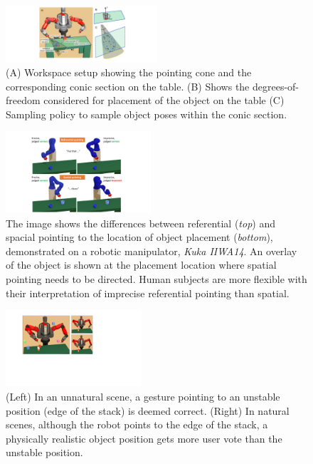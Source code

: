 
\begin{figure}[th!]
    \centering
    \includegraphics[width=0.5\textwidth]{pointing_diagram}
    \caption{(A) Workspace setup showing the pointing cone and the corresponding conic section on the table. (B) Shows the degrees-of-freedom considered for placement of the object on the table (C) Sampling policy to sample object poses within the conic section.}
    \label{fig:pointing}
\end{figure}

\begin{figure}[h!]
    \centering
    \includegraphics[width=0.48\textwidth]{spatial-referential.pdf}
    \caption{The image shows the differences between referential (\textit{top}) and spacial pointing to the location of object placement (\textit{bottom}), demonstrated on a robotic manipulator, \textit{Kuka IIWA14}. An overlay of the object is shown at the placement location where spatial pointing needs to be directed.  Human subjects are more flexible with their interpretation of imprecise referential pointing than spatial.}
    \label{fig:spatial}
\end{figure}

\begin{figure}[h!]
    \centering
    \includegraphics[width=0.45\textwidth]{natural.pdf}
    \caption{(Left) In an unnatural scene, a gesture pointing to an unstable position (edge of the stack) is deemed correct. (Right) In natural scenes, although the robot points to the edge of the stack, a physically realistic object position gets more user vote than the unstable position.}
    \label{fig:natural}
\end{figure}

